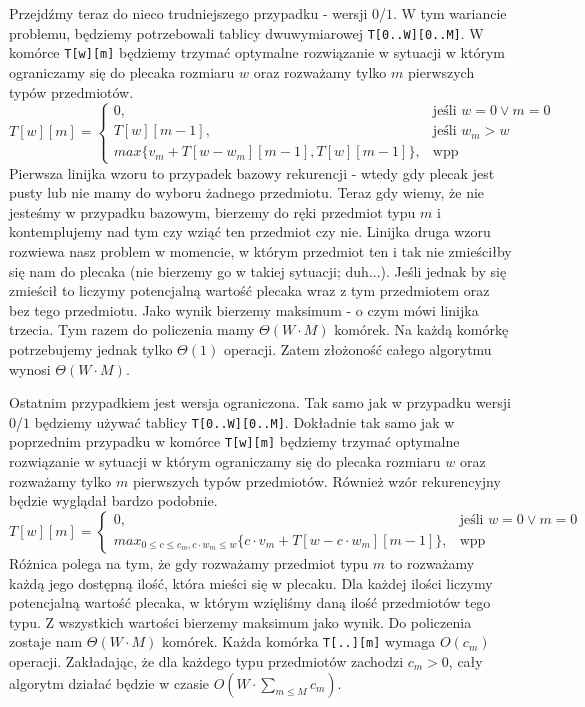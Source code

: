 Przejdźmy teraz do nieco trudniejszego przypadku - wersji $0$/$1$.
W tym wariancie problemu, będziemy potrzebowali tablicy dwuwymiarowej \texttt{T[0..W][0..M]}.
W komórce \texttt{T[w][m]} będziemy trzymać optymalne rozwiązanie w sytuacji w którym ograniczamy się do plecaka rozmiaru $w$ oraz rozważamy tylko $m$ pierwszych typów przedmiotów.
\begin{equation*}
  T[w][m] = \begin{cases}
    0, & \text{jeśli $w = 0 \lor m = 0$}\\
    T[w][m-1], & \text{jeśli $w_m > w$}\\
    max\{v_m + T[w - w_m][m-1], T[w][m-1]\}, & \text{wpp}
  \end{cases}
\end{equation*}
Pierwsza linijka wzoru to przypadek bazowy rekurencji - wtedy gdy plecak jest pusty lub nie mamy do wyboru żadnego przedmiotu.
Teraz gdy wiemy, że nie jesteśmy w przypadku bazowym, bierzemy do ręki przedmiot typu $m$ i kontemplujemy nad tym czy wziąć ten przedmiot czy nie.
Linijka druga wzoru rozwiewa nasz problem w momencie, w którym przedmiot ten i tak nie zmieściłby się nam do plecaka (nie bierzemy go w takiej sytuacji; duh...).
Jeśli jednak by się zmieścił to liczymy potencjalną wartość plecaka wraz z tym przedmiotem oraz bez tego przedmiotu.
Jako wynik bierzemy maksimum - o czym mówi linijka trzecia.
Tym razem do policzenia mamy $\Theta(W \cdot M)$ komórek.
Na każdą komórkę potrzebujemy jednak tylko $\Theta(1)$ operacji.
Zatem złożoność całego algorytmu wynosi $\Theta(W \cdot M)$.

Ostatnim przypadkiem jest wersja ograniczona.
Tak samo jak w przypadku wersji $0$/$1$ będziemy używać tablicy \texttt{T[0..W][0..M]}.
Dokładnie tak samo jak w poprzednim przypadku w komórce \texttt{T[w][m]} będziemy trzymać optymalne rozwiązanie
w sytuacji w którym ograniczamy się do plecaka rozmiaru $w$ oraz rozważamy tylko $m$ pierwszych typów przedmiotów.
Również wzór rekurencyjny będzie wyglądał bardzo podobnie.
\begin{equation*}
  T[w][m] = \begin{cases}
    0, & \text{jeśli $w = 0 \lor m = 0$}\\
    max_{0 \leq c \leq c_m, c \cdot w_m \leq w}\{c \cdot v_m + T[w - c \cdot w_m][m-1]\}, & \text{wpp}
  \end{cases}
\end{equation*}
Różnica polega na tym, że gdy rozważamy przedmiot typu $m$ to rozważamy każdą jego dostępną ilość, która mieści się w plecaku.
Dla każdej ilości liczymy potencjalną wartość plecaka, w którym wzięliśmy daną ilość przedmiotów tego typu.
Z wszystkich wartości bierzemy maksimum jako wynik.
Do policzenia zostaje nam $\Theta(W \cdot M)$ komórek.
Każda komórka \texttt{T[..][m]} wymaga $O(c_m)$ operacji.
Zakładając, że dla każdego typu przedmiotów zachodzi $c_m > 0$, cały algorytm działać będzie w czasie $O(W \cdot \sum_{m \leq M} c_m)$.

